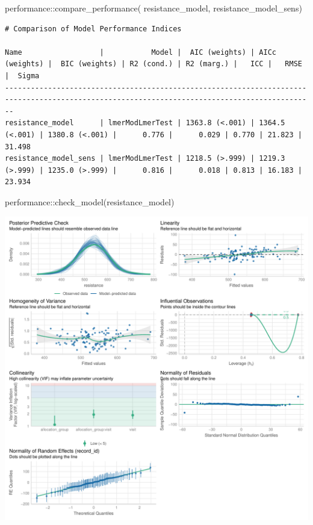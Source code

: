 \documentclass[
  12pt,
]{article}
\newenvironment{Shaded}{\begin{snugshade}}{\end{snugshade}}
\newcommand{\FunctionTok}[1]{\textcolor[rgb]{0.28,0.35,0.67}{#1}}
\newcommand{\NormalTok}[1]{\textcolor[rgb]{0.00,0.23,0.31}{#1}}
\newcommand{\SpecialCharTok}[1]{\textcolor[rgb]{0.37,0.37,0.37}{#1}}
\begin{document}
\begin{Shaded}
\begin{Highlighting}[]
\NormalTok{performance}\SpecialCharTok{::}\FunctionTok{compare\_performance}\NormalTok{(}
\NormalTok{    resistance\_model, }
\NormalTok{    resistance\_model\_sens)}
\end{Highlighting}
\end{Shaded}

\begin{verbatim}
# Comparison of Model Performance Indices

Name                  |           Model |  AIC (weights) | AICc (weights) |  BIC (weights) | R2 (cond.) | R2 (marg.) |   ICC |   RMSE |  Sigma
----------------------------------------------------------------------------------------------------------------------------------------------
resistance_model      | lmerModLmerTest | 1363.8 (<.001) | 1364.5 (<.001) | 1380.8 (<.001) |      0.776 |      0.029 | 0.770 | 21.823 | 31.498
resistance_model_sens | lmerModLmerTest | 1218.5 (>.999) | 1219.3 (>.999) | 1235.0 (>.999) |      0.816 |      0.018 | 0.813 | 16.183 | 23.934
\end{verbatim}

\begin{Shaded}
\begin{Highlighting}[]
\NormalTok{performance}\SpecialCharTok{::}\FunctionTok{check\_model}\NormalTok{(resistance\_model)}
\end{Highlighting}
\end{Shaded}

\includegraphics{Outcomes_files/figure-pdf/resistance_4-1.pdf}
\end{document}
